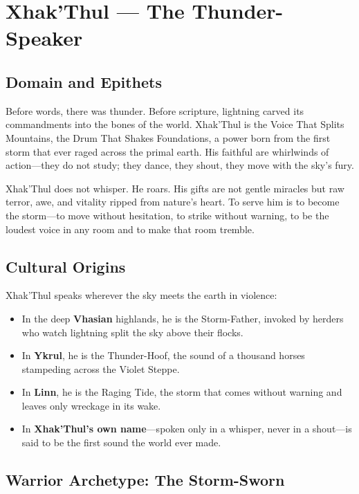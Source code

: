 \section{Xhak'Thul — The Thunder-Speaker}

\subsection{Domain and Epithets}

Before words, there was thunder. Before scripture, lightning carved its commandments into the bones of the world. Xhak'Thul is the Voice That Splits Mountains, the Drum That Shakes Foundations, a power born from the first storm that ever raged across the primal earth. His faithful are whirlwinds of action—they do not study; they dance, they shout, they move with the sky's fury.

Xhak'Thul does not whisper. He roars. His gifts are not gentle miracles but raw terror, awe, and vitality ripped from nature's heart. To serve him is to become the storm—to move without hesitation, to strike without warning, to be the loudest voice in any room and to make that room tremble.

\subsection{Cultural Origins}

Xhak'Thul speaks wherever the sky meets the earth in violence:

\begin{itemize}
\item In the deep \textbf{Vhasian} highlands, he is the Storm-Father, invoked by herders who watch lightning split the sky above their flocks.
\item In \textbf{Ykrul}, he is the Thunder-Hoof, the sound of a thousand horses stampeding across the Violet Steppe.
\item In \textbf{Linn}, he is the Raging Tide, the storm that comes without warning and leaves only wreckage in its wake.
\item In \textbf{Xhak'Thul's own name}—spoken only in a whisper, never in a shout—is said to be the first sound the world ever made.
\end{itemize}

\subsection{Warrior Archetype: The Storm-Sworn}

